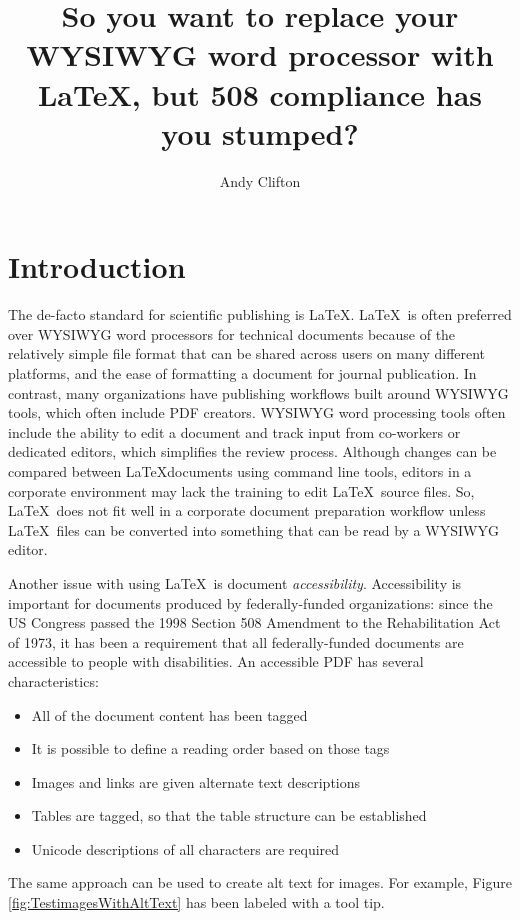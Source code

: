 \documentclass{article}
\author{Andy Clifton}
\title{So you want to replace your WYSIWYG word processor with LaTeX, but 508 compliance has you stumped?}
\begin{document}
  
\tableofcontents
\listoffigures
\listoftables

\section{Introduction}
The de-facto standard for scientific publishing is \LaTeX. \LaTeX\ is often preferred over WYSIWYG word processors for technical documents because of the relatively simple file format that can be shared across users on many different platforms, and the ease of formatting a document for journal publication. In contrast, many organizations have publishing workflows built around WYSIWYG tools, which often include PDF creators. WYSIWYG word processing tools often include the ability to edit a document and track input from co-workers or dedicated editors, which simplifies the review process. Although changes can be compared between \LaTeX documents using command line tools, editors in a corporate environment may lack the training to edit \LaTeX\ source files. So, \LaTeX\ does not fit well in a corporate document preparation workflow unless \LaTeX\ files can be converted into something that can be read by a WYSIWYG editor.

Another issue with using \LaTeX\, is document \emph{accessibility}. Accessibility is important for documents produced by federally-funded organizations: since the US Congress passed the 1998 Section 508 Amendment to the Rehabilitation Act of 1973, it has been a requirement that all federally-funded documents are accessible to people with disabilities. An accessible PDF has several characteristics:

\begin{itemize}
\item All of the document content has been tagged
\item It is possible to define a reading order based on those tags
\item Images and links are given alternate text descriptions
\item Tables are tagged, so that the table structure can be established
\item Unicode descriptions of all characters are required
\end{itemize}

The same approach can be used to create alt text for images. For example, Figure \ref{fig:TestimagesWithAltText} has been labeled with a tool tip. 

\begin{figure*}[htp]
\centering
{}
~
\caption{Test images}\label{fig:TestimagesWithAltText}
\end{figure*}
\end{document}
